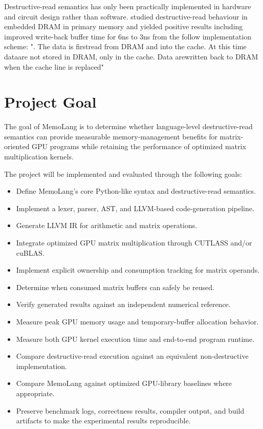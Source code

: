 \documentclass[a4paper]{article}
\begin{document}
Destructive-read semantics has only been practically implemented in hardware and circuit design rather than software. \cite{DybdahlKGN06} studied destructive-read behaviour in embedded DRAM in primary memory and yielded positive results including improved write-back buffer time for 6ns to 3ns from the follow implementation scheme:
". The data is ﬁrstread from DRAM and into the cache. At this time dataare not stored in DRAM, only in the cache. Data arewritten back to DRAM when the cache line is replaced" \cite{DybdahlKGN06}


\section{Project Goal}

The goal of MemoLang is to determine whether language-level destructive-read semantics can provide measurable memory-management benefits for matrix-oriented GPU programs while retaining the performance of optimized matrix multiplication kernels.

The project will be implemented and evaluated through the following goals:

\begin{itemize}
\item Define MemoLang's core Python-like syntax and destructive-read semantics.
\item Implement a lexer, parser, AST, and LLVM-based code-generation pipeline.
\item Generate LLVM IR for arithmetic and matrix operations.
\item Integrate optimized GPU matrix multiplication through CUTLASS and/or cuBLAS.
\item Implement explicit ownership and consumption tracking for matrix operands.
\item Determine when consumed matrix buffers can safely be reused.
\item Verify generated results against an independent numerical reference.
\item Measure peak GPU memory usage and temporary-buffer allocation behavior.
\item Measure both GPU kernel execution time and end-to-end program runtime.
\item Compare destructive-read execution against an equivalent non-destructive implementation.
\item Compare MemoLang against optimized GPU-library baselines where appropriate.
\item Preserve benchmark logs, correctness results, compiler output, and build artifacts to make the experimental results reproducible.
\end{itemize}
\end{document}
